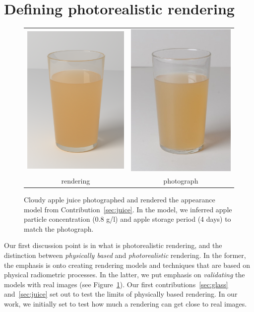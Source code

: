 \section{Defining photorealistic rendering}
\begin{figure}[t]
\centering
\begin{tabular}{@{}c@{}c@{}}
	 \includegraphics[width=0.4\columnwidth]{figures/teaser_render.png} &
	 \includegraphics[width=0.4\columnwidth]{figures/ref_img.jpg}  \\
	rendering & photograph \\
\end{tabular}
\caption{Cloudy apple juice photographed and rendered the appearance model from Contribution~\ref{sec:juice}. In the model, we inferred apple particle concentration (0.8 g/l) and apple storage period (4 days) to match the photograph.} %
\label{fig:juicecomparison}
\end{figure}

Our first discussion point is in what is photorealistic rendering, and the distinction between \emph{physically based} and \emph{photorealistic} rendering. In the former, the emphasis is onto creating rendering models and techniques that are based on physical radiometric processes. In the latter, we put emphasis on \emph{validating} the models with real images (see Figure~\ref{fig:juicecomparison}). Our first contributions~\ref{sec:glass} and~\ref{sec:juice} set out to test the limits of physically based rendering. In our work, we initially set to test how much a rendering can get close to real images. 


